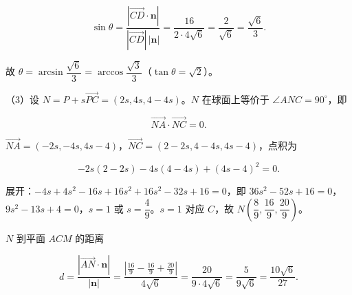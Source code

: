 \begin{answer}
\nopagebreak[4]
\[\sin\theta=\frac{|\overrightarrow{CD}\cdot\boldsymbol n|}{|\overrightarrow{CD}|\,|\boldsymbol n|}=\frac{16}{2\cdot4\sqrt6}=\frac{2}{\sqrt6}=\frac{\sqrt6}{3}.\]

故 $\theta=\arcsin\dfrac{\sqrt6}{3}=\arccos\dfrac{\sqrt3}{3}$（$\tan\theta=\sqrt2$）。

（3）设 $N=P+s\overrightarrow{PC}=(2s,4s,4-4s)$。$N$ 在球面上等价于 $\angle ANC=90^\circ$，即

\nopagebreak[4]
\[\overrightarrow{NA}\cdot\overrightarrow{NC}=0.\]

$\overrightarrow{NA}=(-2s,-4s,4s-4)$，$\overrightarrow{NC}=(2-2s,4-4s,4s-4)$，点积为

\nopagebreak[4]
\[-2s(2-2s)-4s(4-4s)+(4s-4)^2=0.\]

展开：$-4s+4s^2-16s+16s^2+16s^2-32s+16=0$，即 $36s^2-52s+16=0$，$9s^2-13s+4=0$，$s=1$ 或 $s=\dfrac49$。$s=1$ 对应 $C$，故 $N\left(\dfrac89,\dfrac{16}9,\dfrac{20}9\right)$。

$N$ 到平面 $ACM$ 的距离

\nopagebreak[4]
\[d=\frac{|\overrightarrow{AN}\cdot\boldsymbol n|}{|\boldsymbol n|}=\frac{\left|\frac{16}9-\frac{16}9+\frac{20}9\right|}{4\sqrt6}=\frac{20}{9\cdot4\sqrt6}=\frac{5}{9\sqrt6}=\frac{10\sqrt6}{27}.\]


\end{answer}
